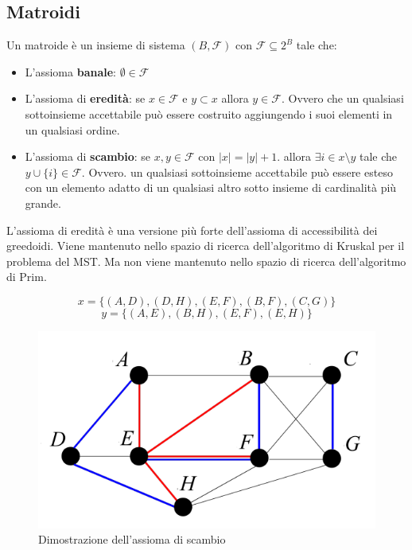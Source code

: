 \documentclass{article}
\begin{document}
\subsection{Matroidi}
Un matroide è un insieme di sistema $(B,\mathcal{F})$ con $\mathcal{F}\subseteq 2^B$ tale che:
\begin{itemize}
    \item L'assioma \textbf{banale}: $\emptyset\in\mathcal{F}$
    \item L'assioma di \textbf{eredità}: se $x\in\mathcal{F}$ e $y\subset x$ allora $y\in\mathcal{F}$. Ovvero
          che un qualsiasi sottoinsieme accettabile può essere costruito aggiungendo i suoi elementi
          in un qualsiasi ordine.
    \item L'assioma di \textbf{scambio}: se $x,y\in\mathcal{F}$ con $|x|=|y|+1$. allora $\exists i\in x\setminus y$
          tale che $y\cup\{i\}\in\mathcal{F}$. Ovvero. un qualsiasi sottoinsieme accettabile può
          essere esteso con un elemento adatto di un qualsiasi altro sotto insieme di cardinalità
          più grande.
\end{itemize}

L'assioma di eredità è una versione più forte dell'assioma di accessibilità dei
greedoidi. Viene mantenuto nello spazio di ricerca dell'algoritmo di Kruskal per il problema
del MST. Ma non viene mantenuto nello spazio di ricerca dell'algoritmo di Prim.

$$x=\{(A,D),(D,H),(E,F),(B,F),(C,G)\}$$
$$y=\{(A,E),(B,H),(E,F),(E,H)\}$$
\begin{figure}[H]
    \centering
    \includegraphics[scale=0.5]{images/matr_mst.png}
    \caption{Dimostrazione dell'assioma di scambio}
\end{figure}
\end{document}

